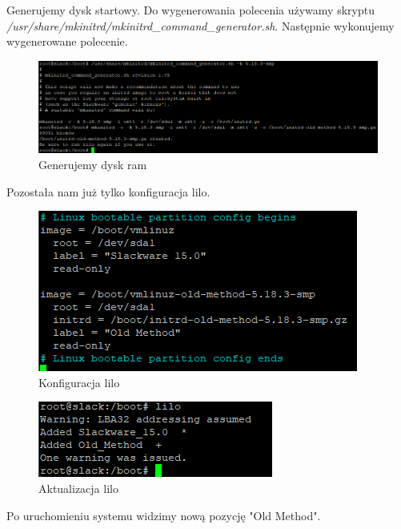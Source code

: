 \documentclass[a4paper,12pt,oneside]{book} %
\begin{document}
\pagebreak

Generujemy dysk startowy. Do wygenerowania polecenia używamy skryptu \emph{/usr/share/mkinitrd/mkinitrd\_command\_generator.sh}. Następnie wykonujemy wygenerowane polecenie.

\begin{figure}[h]
	\centering
	\includegraphics[scale=0.5]{23-ram-v2}
	\caption{Generujemy dysk ram}
\end{figure}

Pozostała nam już tylko konfiguracja lilo.

\begin{figure}[h]
	\centering
	\includegraphics[scale=0.6]{19-lilo-conf}
	\caption{Konfiguracja lilo}
\end{figure}

\begin{figure}[h]
	\centering
	\includegraphics[scale=0.6]{24-lilo}
	\caption{Aktualizacja lilo}
\end{figure}

\pagebreak

Po uruchomieniu systemu widzimy nową pozycję "Old Method".
\end{document}
